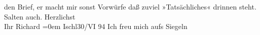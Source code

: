 \begin{ledgroupsized}[t]{13cm}
                    den Brief, er macht mir sonst Vorwürfe daß zuviel »Tatsächliches« {\pb}drinnen steht. Salten auch.\pend
           \pstart
           Herzlichst{\\[\baselineskip]}Ihr \spacefill\mbox{Richard}\pend
           \leftskip=0em{}\pstart
           Ischl30/VI 94\pend
           \pstart
           Ich freu mich aufs Siegeln\pend
           \endnumbering{}\end{ledgroupsized}  \newcommand{\dateiname}{L00342}\newcommand{\titel}{Richard Beer-Hofmann an Arthur Schnitzler, 30. 6. 1894}\newcommand{\editorInnen}{ Martin Anton Müller und Gerd-Hermann Susen}
            \footnotesize
\begin{ledgroupsized}[t]{11.5cm}
\end{ledgroupsized}
         
      